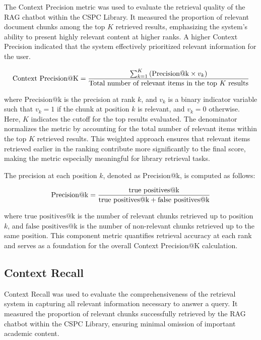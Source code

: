\begin{refsection}
The Context Precision metric was used to evaluate the retrieval quality of the RAG chatbot within the CSPC Library. It measured the proportion of relevant document chunks among the top $K$ retrieved results, emphasizing the system's ability to present highly relevant content at higher ranks. A higher Context Precision indicated that the system effectively prioritized relevant information for the user.

\begin{equation}
\centering
\text{Context Precision@K} = 
\frac{
    \sum_{k=1}^{K} \left( \text{Precision@k} \times v_k \right)
}{
    \text{Total number of relevant items in the top } K \text{ results}
}
\end{equation}

where $\text{Precision@k}$ is the precision at rank $k$, and $v_k$ is a binary indicator variable such that $v_k = 1$ if the chunk at position $k$ is relevant, and $v_k = 0$ otherwise. Here, $K$ indicates the cutoff for the top results evaluated. The denominator normalizes the metric by accounting for the total number of relevant items within the top $K$ retrieved results. This weighted approach ensures that relevant items retrieved earlier in the ranking contribute more significantly to the final score, making the metric especially meaningful for library retrieval tasks.

The precision at each position $k$, denoted as Precision@k, is computed as follows:

\begin{equation}
\centering
\text{Precision@k} = 
\frac{
    \text{true positives@k}
}{
    \text{true positives@k} + \text{false positives@k}
}
\end{equation}

where $\text{true positives@k}$ is the number of relevant chunks retrieved up to position $k$, and $\text{false positives@k}$ is the number of non-relevant chunks retrieved up to the same position. This component metric quantifies retrieval accuracy at each rank and serves as a foundation for the overall Context Precision@K calculation.

\subsection*{Context Recall}

Context Recall was used to evaluate the comprehensiveness of the retrieval system in capturing all relevant information necessary to answer a query. It measured the proportion of relevant chunks successfully retrieved by the RAG chatbot within the CSPC Library, ensuring minimal omission of important academic content.


\end{refsection}
